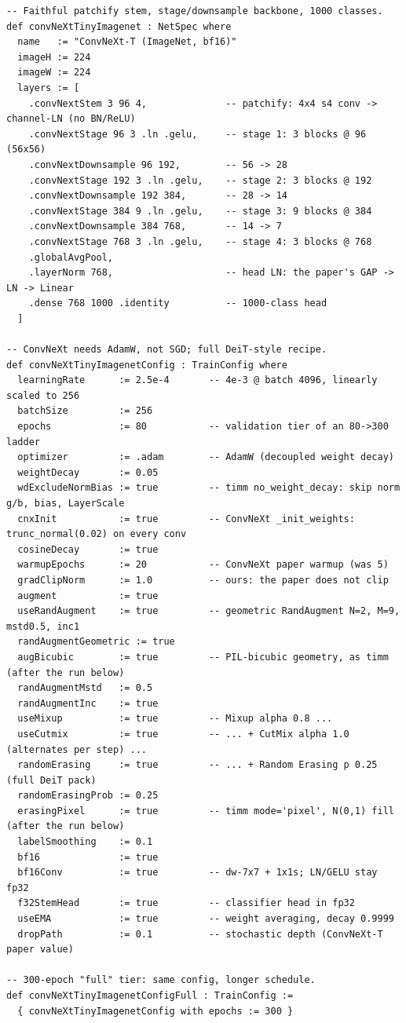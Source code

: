 \begin{verbatim}
-- Faithful patchify stem, stage/downsample backbone, 1000 classes.
def convNeXtTinyImagenet : NetSpec where
  name   := "ConvNeXt-T (ImageNet, bf16)"
  imageH := 224
  imageW := 224
  layers := [
    .convNextStem 3 96 4,              -- patchify: 4x4 s4 conv -> channel-LN (no BN/ReLU)
    .convNextStage 96 3 .ln .gelu,     -- stage 1: 3 blocks @ 96  (56x56)
    .convNextDownsample 96 192,        -- 56 -> 28
    .convNextStage 192 3 .ln .gelu,    -- stage 2: 3 blocks @ 192
    .convNextDownsample 192 384,       -- 28 -> 14
    .convNextStage 384 9 .ln .gelu,    -- stage 3: 9 blocks @ 384
    .convNextDownsample 384 768,       -- 14 -> 7
    .convNextStage 768 3 .ln .gelu,    -- stage 4: 3 blocks @ 768
    .globalAvgPool,
    .layerNorm 768,                    -- head LN: the paper's GAP -> LN -> Linear
    .dense 768 1000 .identity          -- 1000-class head
  ]

-- ConvNeXt needs AdamW, not SGD; full DeiT-style recipe.
def convNeXtTinyImagenetConfig : TrainConfig where
  learningRate      := 2.5e-4       -- 4e-3 @ batch 4096, linearly scaled to 256
  batchSize         := 256
  epochs            := 80           -- validation tier of an 80->300 ladder
  optimizer         := .adam        -- AdamW (decoupled weight decay)
  weightDecay       := 0.05
  wdExcludeNormBias := true         -- timm no_weight_decay: skip norm g/b, bias, LayerScale
  cnxInit           := true         -- ConvNeXt _init_weights: trunc_normal(0.02) on every conv
  cosineDecay       := true
  warmupEpochs      := 20           -- ConvNeXt paper warmup (was 5)
  gradClipNorm      := 1.0          -- ours: the paper does not clip
  augment           := true
  useRandAugment    := true         -- geometric RandAugment N=2, M=9, mstd0.5, inc1
  randAugmentGeometric := true
  augBicubic        := true         -- PIL-bicubic geometry, as timm (after the run below)
  randAugmentMstd   := 0.5
  randAugmentInc    := true
  useMixup          := true         -- Mixup alpha 0.8 ...
  useCutmix         := true         -- ... + CutMix alpha 1.0 (alternates per step) ...
  randomErasing     := true         -- ... + Random Erasing p 0.25 (full DeiT pack)
  randomErasingProb := 0.25
  erasingPixel      := true         -- timm mode='pixel', N(0,1) fill (after the run below)
  labelSmoothing    := 0.1
  bf16              := true
  bf16Conv          := true         -- dw-7x7 + 1x1s; LN/GELU stay fp32
  f32StemHead       := true         -- classifier head in fp32
  useEMA            := true         -- weight averaging, decay 0.9999
  dropPath          := 0.1          -- stochastic depth (ConvNeXt-T paper value)

-- 300-epoch "full" tier: same config, longer schedule.
def convNeXtTinyImagenetConfigFull : TrainConfig :=
  { convNeXtTinyImagenetConfig with epochs := 300 }
\end{verbatim}

